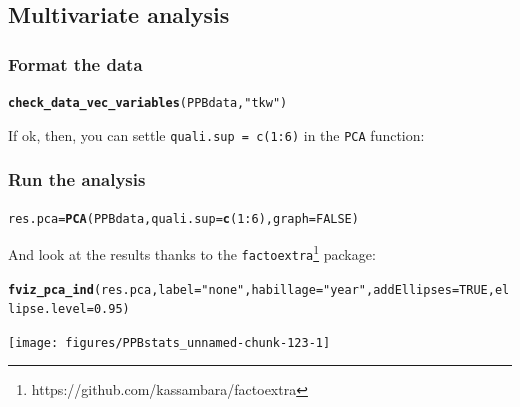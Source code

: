 \documentclass{article}\usepackage[]{graphicx}\usepackage[]{color}
\makeatletter
\newcommand{\hlnum}[1]{\textcolor[rgb]{0.686,0.059,0.569}{#1}}%
\newcommand{\hlstr}[1]{\textcolor[rgb]{0.192,0.494,0.8}{#1}}%
\newcommand{\hlopt}[1]{\textcolor[rgb]{0,0,0}{#1}}%
\newcommand{\hlstd}[1]{\textcolor[rgb]{0.345,0.345,0.345}{#1}}%
\newcommand{\hlkwb}[1]{\textcolor[rgb]{0.69,0.353,0.396}{#1}}%
\newcommand{\hlkwc}[1]{\textcolor[rgb]{0.333,0.667,0.333}{#1}}%
\newcommand{\hlkwd}[1]{\textcolor[rgb]{0.737,0.353,0.396}{\textbf{#1}}}%
\newenvironment{kframe}{%
 \def\at@end@of@kframe{}%
 \ifinner\ifhmode%
  \def\at@end@of@kframe{\end{minipage}}%
  \begin{minipage}{\columnwidth}%
 \fi\fi%
 \def\FrameCommand##1{\hskip\@totalleftmargin \hskip-\fboxsep
 \colorbox{shadecolor}{##1}\hskip-\fboxsep
     \hskip-\linewidth \hskip-\@totalleftmargin \hskip\columnwidth}%
 \MakeFramed {\advance\hsize-\width
   \@totalleftmargin\z@ \linewidth\hsize
   \@setminipage}}%
 {\par\unskip\endMakeFramed%
 \at@end@of@kframe}
\newenvironment{knitrout}{}{} %
\makeatother
\begin{document}
\subsection{Multivariate analysis}
\label{multivariate_analysis}

\subsubsection{Format the data}

\begin{knitrout}
\color{fgcolor}\begin{kframe}
\begin{alltt}
\hlkwd{check_data_vec_variables}\hlstd{(PPBdata,} \hlstr{"tkw"}\hlstd{)}
\end{alltt}
\end{kframe}
\end{knitrout}

If ok, then, you can settle \texttt{quali.sup = c(1:6)} in the \texttt{PCA} function:

\subsubsection{Run the analysis}


\begin{knitrout}
\color{fgcolor}\begin{kframe}
\begin{alltt}
\hlstd{res.pca} \hlkwb{=} \hlkwd{PCA}\hlstd{(PPBdata,} \hlkwc{quali.sup} \hlstd{=} \hlkwd{c}\hlstd{(}\hlnum{1}\hlopt{:}\hlnum{6}\hlstd{),} \hlkwc{graph} \hlstd{=} \hlnum{FALSE}\hlstd{)}
\end{alltt}
\end{kframe}
\end{knitrout}

And look at the results thanks to the \texttt{factoextra}\footnote{https://github.com/kassambara/factoextra} package:

\begin{knitrout}
\color{fgcolor}\begin{kframe}
\begin{alltt}
\hlkwd{fviz_pca_ind}\hlstd{(res.pca,} \hlkwc{label}\hlstd{=}\hlstr{"none"}\hlstd{,} \hlkwc{habillage}\hlstd{=}\hlstr{"year"}\hlstd{,} \hlkwc{addEllipses}\hlstd{=}\hlnum{TRUE}\hlstd{,} \hlkwc{ellipse.level}\hlstd{=}\hlnum{0.95}\hlstd{)}
\end{alltt}
\end{kframe}

{\centering \texttt{[image: figures/PPBstats\_unnamed-chunk-123-1]} 

}



\end{knitrout}
\end{document}
